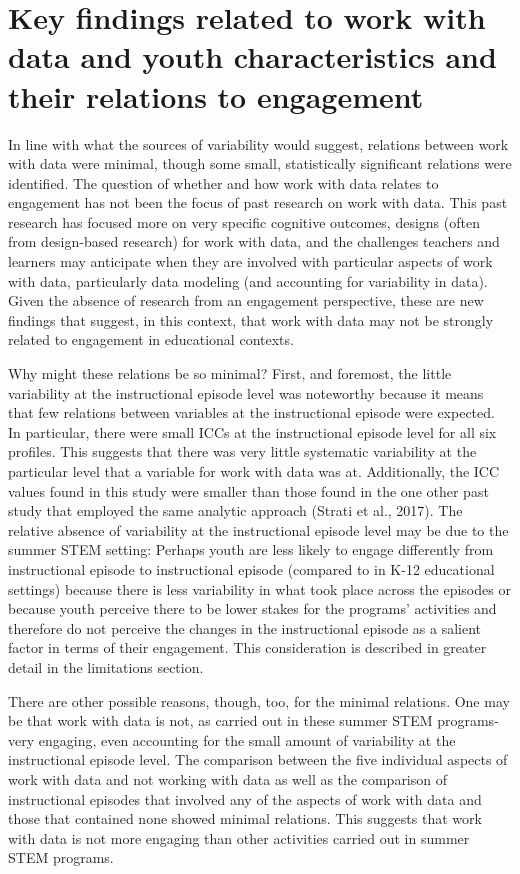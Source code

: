 \documentclass[]{msu-thesis}
\theoremstyle{definition}
\theoremstyle{definition}
\theoremstyle{definition}
\theoremstyle{remark}
\begin{document}
\section{Key findings related to work with data and youth
characteristics and their relations to
engagement}\label{key-findings-related-to-work-with-data-and-youth-characteristics-and-their-relations-to-engagement}

In line with what the sources of variability would suggest, relations
between work with data were minimal, though some small, statistically
significant relations were identified. The question of whether and how
work with data relates to engagement has not been the focus of past
research on work with data. This past research has focused more on very
specific cognitive outcomes, designs (often from design-based research)
for work with data, and the challenges teachers and learners may
anticipate when they are involved with particular aspects of work with
data, particularly data modeling (and accounting for variability in
data). Given the absence of research from an engagement perspective,
these are new findings that suggest, in this context, that work with
data may not be strongly related to engagement in educational contexts.

Why might these relations be so minimal? First, and foremost, the little
variability at the instructional episode level was noteworthy because it
means that few relations between variables at the instructional episode
were expected. In particular, there were small ICCs at the instructional
episode level for all six profiles. This suggests that there was very
little systematic variability at the particular level that a variable
for work with data was at. Additionally, the ICC values found in this
study were smaller than those found in the one other past study that
employed the same analytic approach (Strati et al., 2017). The relative
absence of variability at the instructional episode level may be due to
the summer STEM setting: Perhaps youth are less likely to engage
differently from instructional episode to instructional episode
(compared to in K-12 educational settings) because there is less
variability in what took place across the episodes or because youth
perceive there to be lower stakes for the programs' activities and
therefore do not perceive the changes in the instructional episode as a
salient factor in terms of their engagement. This consideration is
described in greater detail in the limitations section.

There are other possible reasons, though, too, for the minimal
relations. One may be that work with data is not, as carried out in
these summer STEM programs- very engaging, even accounting for the small
amount of variability at the instructional episode level. The comparison
between the five individual aspects of work with data and not working
with data as well as the comparison of instructional episodes that
involved any of the aspects of work with data and those that contained
none showed minimal relations. This suggests that work with data is not
more engaging than other activities carried out in summer STEM programs.
\end{document}
